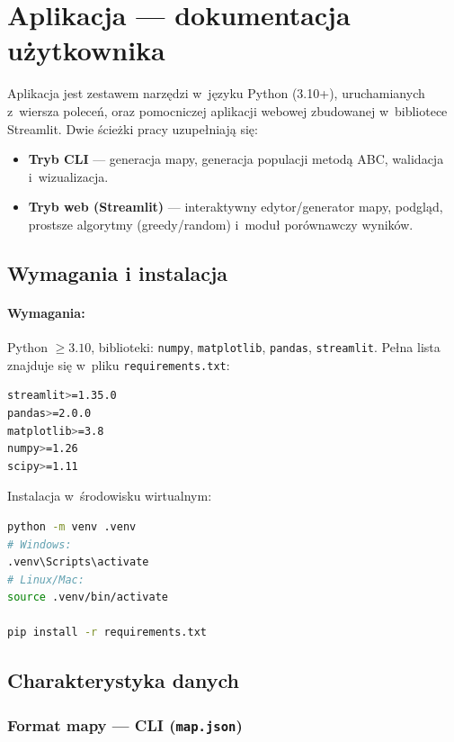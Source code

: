 \section{Aplikacja --- dokumentacja użytkownika}
\label{sec:aplikacja}

Aplikacja jest zestawem narzędzi w~języku Python (3.10+), uruchamianych z~wiersza
poleceń, oraz pomocniczej aplikacji webowej zbudowanej w~bibliotece Streamlit.
Dwie ścieżki pracy uzupełniają się:

\begin{itemize}
    \item \textbf{Tryb CLI} --- generacja mapy, generacja populacji metodą ABC,
          walidacja i~wizualizacja.
    \item \textbf{Tryb web (Streamlit)} --- interaktywny edytor/generator mapy,
          podgląd, prostsze algorytmy (greedy/random) i~moduł porównawczy wyników.
\end{itemize}

\subsection{Wymagania i instalacja}

\paragraph{Wymagania:} Python $\ge 3.10$, biblioteki:
\texttt{numpy}, \texttt{matplotlib}, \texttt{pandas}, \texttt{streamlit}.
Pełna lista znajduje się w~pliku \texttt{requirements.txt}:

\begin{lstlisting}[language=bash, caption={Zawartość pliku \texttt{requirements.txt}}]
streamlit>=1.35.0
pandas>=2.0.0
matplotlib>=3.8
numpy>=1.26
scipy>=1.11
\end{lstlisting}

Instalacja w~środowisku wirtualnym:
\begin{lstlisting}[language=bash]
python -m venv .venv
# Windows:
.venv\Scripts\activate
# Linux/Mac:
source .venv/bin/activate

pip install -r requirements.txt
\end{lstlisting}

\subsection{Charakterystyka danych}
\label{sec:dane}

\subsubsection{Format mapy --- CLI (\texttt{map.json})}

